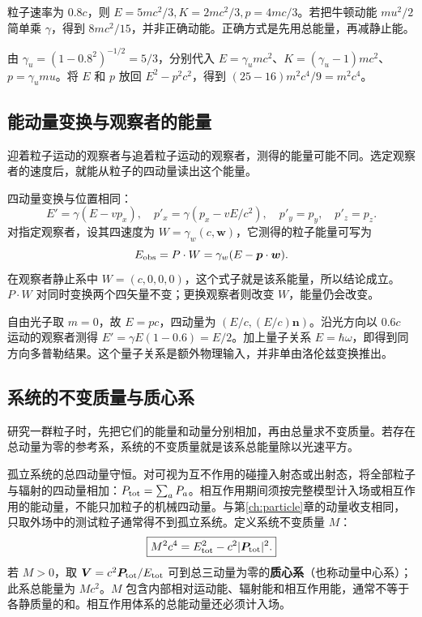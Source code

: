 \begin{example}[动能和动量不能使用同一个修正因子]
粒子速率为 $0.8c$，则 $E=5mc^2/3,K=2mc^2/3,p=4mc/3$。若把牛顿动能 $mu^2/2$ 简单乘 $\gamma$，得到 $8mc^2/15$，并非正确动能。正确方式是先用总能量，再减静止能。

由 $\gamma_u=(1-0.8^2)^{-1/2}=5/3$，分别代入 $E=\gamma_umc^2$、$K=(\gamma_u-1)mc^2$、$p=\gamma_umu$。将 $E$ 和 $p$ 放回 $E^2-p^2c^2$，得到 $(25-16)m^2c^4/9=m^2c^4$。
\end{example}

\subsection{能动量变换与观察者的能量}
迎着粒子运动的观察者与追着粒子运动的观察者，测得的能量可能不同。选定观察者的速度后，就能从粒子的四动量读出这个能量。

四动量变换与位置相同：
\[
E'=\gamma(E-vp_x),\quad p'_x=\gamma(p_x-vE/c^2),\quad p'_y=p_y,\quad p'_z=p_z.
\]
对指定观察者，设其四速度为 $W=\gamma_w(c,\boldsymbol{w})$，它测得的粒子能量可写为
\[
E_{\rm obs}=P\cdot W=\gamma_w(E-\boldsymbol{p}\cdot\boldsymbol{w}).
\]
在观察者静止系中 $W=(c,0,0,0)$，这个式子就是该系能量，所以结论成立。$P\cdot W$ 对同时变换两个四矢量不变；更换观察者则改变 $W$，能量仍会改变。

\begin{example}[追赶一个光子]
自由光子取 $m=0$，故 $E=pc$，四动量为 $(E/c,(E/c)\boldsymbol{n})$。沿光方向以 $0.6c$ 运动的观察者测得 $E'=\gamma E(1-0.6)=E/2$。加上量子关系 $E=\hbar\omega$，即得到同方向多普勒结果。这个量子关系是额外物理输入，并非单由洛伦兹变换推出。
\end{example}

\subsection{系统的不变质量与质心系}
研究一群粒子时，先把它们的能量和动量分别相加，再由总量求不变质量。若存在总动量为零的参考系，系统的不变质量就是该系总能量除以光速平方。

孤立系统的总四动量守恒。对可视为互不作用的碰撞入射态或出射态，将全部粒子与辐射的四动量相加：$P_{\rm tot}=\sum_aP_a$。相互作用期间须按完整模型计入场或相互作用的能动量，不能只加粒子的机械四动量。与第\ref{ch:particle}章的动量收支相同，只取外场中的测试粒子通常得不到孤立系统。定义系统不变质量 $M$：
\[
\boxed{M^2c^4=E_{\rm tot}^2-c^2|\boldsymbol{P}_{\rm tot}|^2.}
\]
若 $M>0$，取 $\boldsymbol{V}=c^2\boldsymbol{P}_{\rm tot}/E_{\rm tot}$ 可到总三动量为零的\textbf{质心系}（也称动量中心系）；此系总能量为 $Mc^2$。$M$ 包含内部相对运动能、辐射能和相互作用能，通常不等于各静质量的和。相互作用体系的总能动量还必须计入场。

